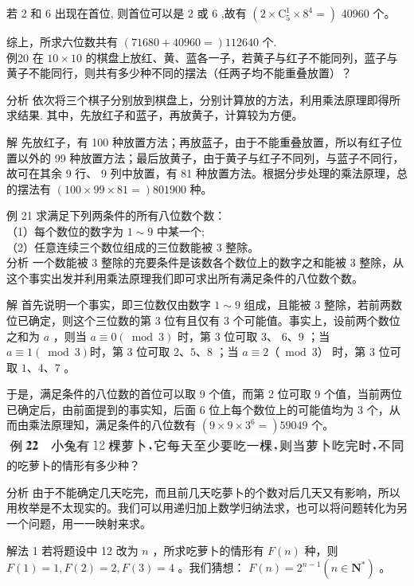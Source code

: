 \documentclass[10pt]{article}
\begin{document}
若 2 和 6 出现在首位, 则首位可以是 2 或 6 ,故有 $\left(2 \times \mathrm{C}_{5}^{1} \times 8^{4}=\right)$ 40960 个。

综上，所求六位数共有 $(71680+40960=) 112640$ 个.\\
例20 在 $10 \times 10$ 的棋盘上放红、黄、蓝各一子，若黄子与红子不能同列，蓝子与黄子不能同行，则共有多少种不同的摆法（任两子均不能重叠放置）？

分析 依次将三个棋子分别放到棋盘上，分别计算放的方法，利用乘法原理即得所求结果. 其中，先放红子和蓝子，再放黄子，计算较为方便。

解 先放红子，有 100 种放置方法；再放蓝子，由于不能重叠放置，所以有红子位置以外的 99 种放置方法；最后放黄子，由于黄子与红子不同列，与蓝子不同行，故可在其余 9 行、 9 列中放置，有 81 种放置方法。根据分步处理的乘法原理，总的摆法有 $(100 \times 99 \times 81=) 801900$ 种。

例 21 求满足下列两条件的所有八位数个数：\\
（1）每个数位的数字为 $1 \sim 9$ 中某一个;\\
（2）任意连续三个数位组成的三位数能被 3 整除。\\
分析 一个数能被 3 整除的充要条件是该数各个数位上的数字之和能被 3 整除，从这个事实出发并利用乘法原理我们即可求出所有满足条件的八位数个数。

解 首先说明一个事实，即三位数仅由数字 $1 \sim 9$ 组成，且能被 3 整除，若前两数位已确定，则这个三位数的第 3 位有且仅有 3 个可能值。事实上，设前两个数位之和为 $a$ ，则当 $a \equiv 0(\bmod 3)$ 时，第 3 位可取 3、 $6 、 9$ ；当 $a \equiv 1(\bmod 3)$时，第 3 位可取 $2 、 5 、 8$ ；当 $a \equiv 2 （ \bmod 3 ）$ 时，第 3 位可取 $1 、 4 、 7$ 。

于是，满足条件的八位数的首位可以取 9 个值，而第 2 位可取 9 个值，当前两位已确定后，由前面提到的事实知，后面 6 位上每个数位上的可能值均为 3 个，从而由乘法原理知，满足条件的八位数有 $\left(9 \times 9 \times 3^{6}=\right) 59049$ 个。\\
\includegraphics[max width=\textwidth]{2024_10_09_bce9f07034ef55fc9c97g-16}的吃萝卜的情形有多少种？

分析 由于不能确定几天吃完，而且前几天吃夢卜的个数对后几天又有影响，所以用枚举是不太现实的。我们可以用递归加上数学归纳法求，也可以将问题转化为另一个问题，用一一映射来求。

解法 1 若将题设中 12 改为 $n$ ，所求吃萝卜的情形有 $F(n)$ 种，则 $F(1)=1, F(2)=2, F(3)=4$ 。我们猜想： $F(n)=2^{n-1}\left(n \in \mathbf{N}^{*}\right)$ 。
\end{document}
